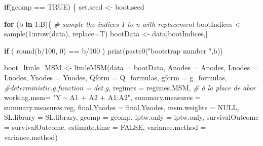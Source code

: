 \documentclass[
]{book}
\newenvironment{Shaded}{\begin{snugshade}}{\end{snugshade}}
\newcommand{\AttributeTok}[1]{\textcolor[rgb]{0.77,0.63,0.00}{#1}}
\newcommand{\CommentTok}[1]{\textcolor[rgb]{0.56,0.35,0.01}{\textit{#1}}}
\newcommand{\ConstantTok}[1]{\textcolor[rgb]{0.00,0.00,0.00}{#1}}
\newcommand{\ControlFlowTok}[1]{\textcolor[rgb]{0.13,0.29,0.53}{\textbf{#1}}}
\newcommand{\DecValTok}[1]{\textcolor[rgb]{0.00,0.00,0.81}{#1}}
\newcommand{\FunctionTok}[1]{\textcolor[rgb]{0.00,0.00,0.00}{#1}}
\newcommand{\NormalTok}[1]{#1}
\newcommand{\OtherTok}[1]{\textcolor[rgb]{0.56,0.35,0.01}{#1}}
\newcommand{\SpecialCharTok}[1]{\textcolor[rgb]{0.00,0.00,0.00}{#1}}
\newcommand{\StringTok}[1]{\textcolor[rgb]{0.31,0.60,0.02}{#1}}
\begin{document}
\begin{Shaded}
\begin{Highlighting}[]
  \ControlFlowTok{if}\NormalTok{(gcomp }\SpecialCharTok{==} \ConstantTok{TRUE}\NormalTok{) \{}
\NormalTok{    set.seed }\OtherTok{\textless{}{-}}\NormalTok{ boot.seed}

    \ControlFlowTok{for}\NormalTok{ (b }\ControlFlowTok{in} \DecValTok{1}\SpecialCharTok{:}\NormalTok{B)\{}
      \CommentTok{\# sample the indices 1 to n with replacement}
\NormalTok{      bootIndices }\OtherTok{\textless{}{-}} \FunctionTok{sample}\NormalTok{(}\DecValTok{1}\SpecialCharTok{:}\FunctionTok{nrow}\NormalTok{(data), }\AttributeTok{replace=}\NormalTok{T)}
\NormalTok{      bootData }\OtherTok{\textless{}{-}}\NormalTok{ data[bootIndices,]}

      \ControlFlowTok{if}\NormalTok{ ( }\FunctionTok{round}\NormalTok{(b}\SpecialCharTok{/}\DecValTok{100}\NormalTok{, }\DecValTok{0}\NormalTok{) }\SpecialCharTok{==}\NormalTok{ b}\SpecialCharTok{/}\DecValTok{100}\NormalTok{ ) }\FunctionTok{print}\NormalTok{(}\FunctionTok{paste0}\NormalTok{(}\StringTok{"bootstrap number "}\NormalTok{,b))}

\NormalTok{      boot\_ltmle\_MSM }\OtherTok{\textless{}{-}} \FunctionTok{ltmleMSM}\NormalTok{(}\AttributeTok{data =}\NormalTok{ bootData,}
                                 \AttributeTok{Anodes =}\NormalTok{ Anodes,}
                                 \AttributeTok{Lnodes =}\NormalTok{ Lnodes,}
                                 \AttributeTok{Ynodes =}\NormalTok{ Ynodes,}
                                 \AttributeTok{Qform =}\NormalTok{ Q\_formulas,}
                                 \AttributeTok{gform =}\NormalTok{ g\_formulas,}
                                 \CommentTok{\#deterministic.g.function = det.g,}
                                 \AttributeTok{regimes =}\NormalTok{ regimes.MSM, }\CommentTok{\# à la place de abar}
                                 \AttributeTok{working.msm=} \StringTok{"Y \textasciitilde{} A1 + A2 + A1:A2"}\NormalTok{,}
                                 \AttributeTok{summary.measures =}\NormalTok{ summary.measures.reg,}
                                 \AttributeTok{final.Ynodes =}\NormalTok{ final.Ynodes,}
                                 \AttributeTok{msm.weights =} \ConstantTok{NULL}\NormalTok{,}
                                 \AttributeTok{SL.library =}\NormalTok{ SL.library,}
                                 \AttributeTok{gcomp =}\NormalTok{ gcomp,}
                                 \AttributeTok{iptw.only =}\NormalTok{ iptw.only,}
                                 \AttributeTok{survivalOutcome =}\NormalTok{ survivalOutcome,}
                                 \AttributeTok{estimate.time =} \ConstantTok{FALSE}\NormalTok{,}
                                 \AttributeTok{variance.method =}\NormalTok{ variance.method)}


\end{Highlighting}
\end{Shaded}
\end{document}
